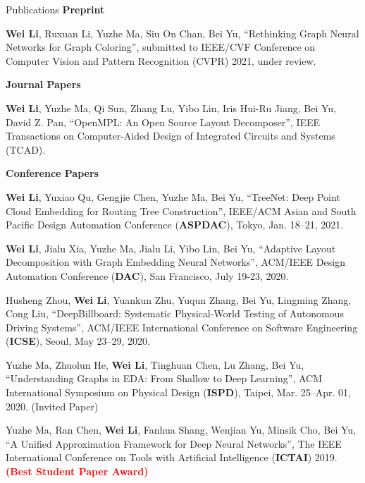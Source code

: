 \begin{rSection}{Publications}
    \textbf{Preprint}
    \begin{description}[font=\normalfont]
        \item[{[C1]}]{
            \textbf{Wei Li}, Ruxuan Li, Yuzhe Ma, Siu On Chan, Bei Yu,
            ``Rethinking Graph Neural Networks for Graph Coloring'', submitted to IEEE/CVF Conference on Computer Vision and Pattern Recognition (CVPR) 2021, under review.
        }
    \end{description}
    \textbf{Journal Papers}
    \begin{description}[font=\normalfont]
        \item[{[J1]}]{
            \textbf{Wei Li}, Yuzhe Ma, Qi Sun, Zhang Lu, Yibo Lin, Iris Hui-Ru Jiang, Bei Yu, David Z. Pan,
            ``OpenMPL: An Open Source Layout Decomposer'', IEEE Transactions on Computer-Aided Design of Integrated Circuits and Systems (TCAD).
        }
    \end{description}
\textbf{Conference Papers}
\begin{description}[font=\normalfont]
\item[{[C8]}]{
    \textbf{Wei Li}, Yuxiao Qu, Gengjie Chen, Yuzhe Ma, Bei Yu,
    ``TreeNet: Deep Point Cloud Embedding for Routing Tree Construction'', 
    IEEE/ACM Asian and South Pacific Design Automation Conference (\textbf{ASPDAC}), Tokyo, Jan. 18–21, 2021.
}
\item[{[C7]}]{
    \textbf{Wei Li}, Jialu Xia, Yuzhe Ma, Jialu Li, Yibo Lin, Bei Yu, 
    ``Adaptive Layout Decomposition with Graph Embedding Neural Networks'', 
    ACM/IEEE Design Automation Conference (\textbf{DAC}), San Francisco, July 19-23, 2020.
}
\item[{[C6]}]{
    Husheng Zhou, \textbf{Wei Li}, Yuankun Zhu, Yuqun Zhang, Bei Yu, Lingming Zhang, Cong Liu, 
    ``DeepBillboard: Systematic Physical-World Testing of Autonomous Driving Systems'', ACM/IEEE International Conference on Software Engineering (\textbf{ICSE}), Seoul, May 23–29, 2020.
}
\item[{[C5]}]{
    Yuzhe Ma, Zhuolun He, \textbf{Wei Li}, Tinghuan Chen, Lu Zhang, Bei Yu, 
    ``Understanding Graphs in EDA: From Shallow to Deep Learning'', ACM International Symposium on Physical Design (\textbf{ISPD}), Taipei, Mar. 25–Apr. 01, 2020. {(Invited Paper)}
}
\item[{[C4]}]{
    Yuzhe Ma, Ran Chen, \textbf{Wei Li}, Fanhua Shang, Wenjian Yu, Minsik Cho, Bei Yu, 
    ``A Unified Approximation Framework for Deep Neural Networks'', The IEEE International Conference on Tools with Artificial Intelligence (\textbf{ICTAI}) 2019. \textcolor{red}{\textbf{(Best Student Paper Award)}}
}
\end{description}
\end{rSection}
